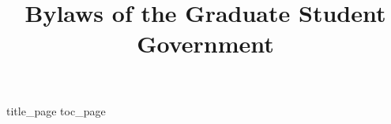 \documentclass{report}
\title{Bylaws of the Graduate Student Government}
\date{\displaydate{bylaws-date}}
\begin{document}
{title_page}
{toc_page}











\end{document}
